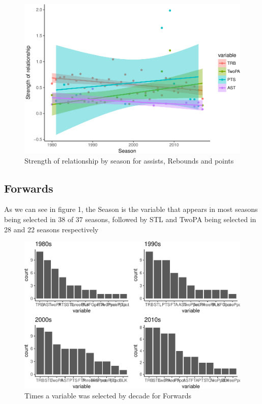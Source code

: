 \documentclass[]{elsarticle} %
\makeatletter
\def\maxwidth{\ifdim\Gin@nat@width>\linewidth\linewidth
\else\Gin@nat@width\fi}
\let\Oldincludegraphics\includegraphics
\renewcommand{\includegraphics}[1]{\Oldincludegraphics[width=\maxwidth]{#1}}
\makeatother
\begin{document}
\begin{figure}[htbp]
\centering
\includegraphics{Coaching_Selection_files/figure-latex/unnamed-chunk-8-1.pdf}
\caption{Strength of relationship by season for assists, Rebounds and
points}
\end{figure}

\subsection{Forwards}\label{forwards}

As we can see in figure 1, the Season is the variable that appears in
most seasons being selected in 38 of 37 seasons, followed by STL and
TwoPA being selected in 28 and 22 seasons respectively

\begin{figure}[htbp]
\centering
\includegraphics{Coaching_Selection_files/figure-latex/unnamed-chunk-10-1.pdf}
\caption{Times a variable was selected by decade for Forwards}
\end{figure}
\end{document}
